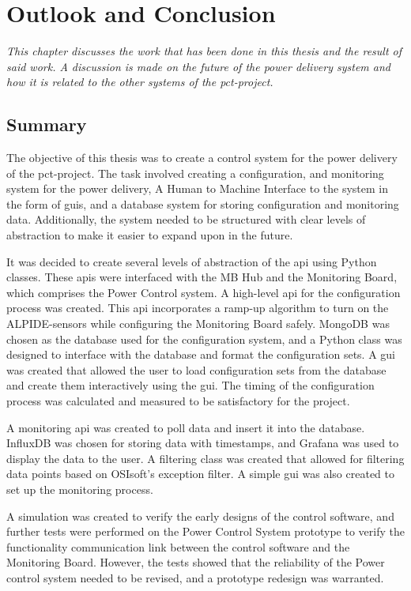 \documentclass[main.tex]{subfiles}
\begin{document}
\section{Outlook and Conclusion}
\textit{This chapter discusses the work that has been done in this thesis and the result of said work. A discussion is made on the future of the power delivery system and how it is related to the other systems of the \gls{pct}-project.}

\subsection{Summary}

The objective of this thesis was to create a control system for the power delivery of the \gls{pct}-project. The task involved creating a configuration, and monitoring system for the power delivery, A Human to Machine Interface to the system in the form of \gls{gui}s, and a database system for storing configuration and monitoring data. Additionally, the system needed to be structured with clear levels of abstraction to make it easier to expand upon in the future.

It was decided to create several levels of abstraction of the \gls{api} using Python classes. These \gls{api}s were interfaced with the MB Hub and the Monitoring Board, which comprises the Power Control system. A high-level \gls{api} for the configuration process was created. This \gls{api} incorporates a ramp-up algorithm to turn on the ALPIDE-sensors while configuring the Monitoring Board safely. MongoDB was chosen as the database used for the configuration system, and a Python class was designed to interface with the database and format the configuration sets. A \gls{gui} was created that allowed the user to load configuration sets from the database and create them interactively using the \gls{gui}. The timing of the configuration process was calculated and measured to be satisfactory for the project.

A monitoring \gls{api} was created to poll data and insert it into the database. InfluxDB was chosen for storing data with timestamps, and Grafana was used to display the data to the user. A filtering class was created that allowed for filtering data points based on OSIsoft's exception filter. A simple \gls{gui} was also created to set up the monitoring process.

A simulation was created to verify the early designs of the control software, and further tests were performed on the Power Control System prototype to verify the functionality communication link between the control software and the Monitoring Board. However, the tests showed that the reliability of the Power control system needed to be revised, and a prototype redesign was warranted.
\end{document}
